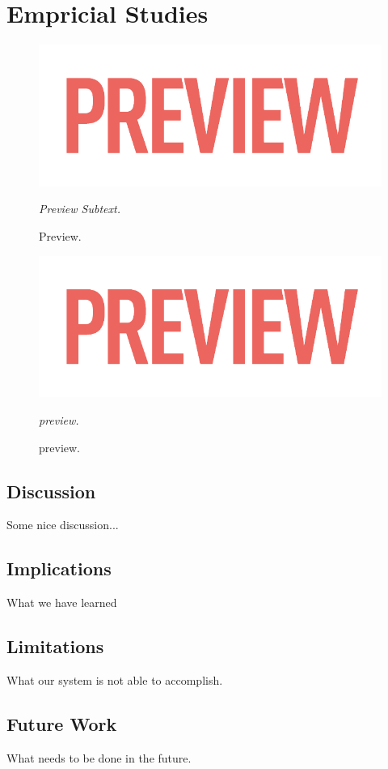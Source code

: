 
\cleartoleftpage

\chapter{Empricial Studies}
\label{chap4}

\lipsum[1]

\begin{figure}[H]
	\captionsetup{width=\textwidth}
	\centering
	\includegraphics[width=\textwidth]{figures/preview.png} 
	\caption{Preview.}
	\medskip\small
	\textit{Preview Subtext.}
	\label{prev1}
\end{figure}
\lipsum[7]
\begin{figure}[b]
	\captionsetup{width=\textwidth}
	\centering
	\includegraphics[width=\textwidth]{figures/preview.png} 
	\caption{preview.}
	\medskip\small
	\textit{preview. }
	\label{prev2}
\end{figure}

\section{Discussion}
Some nice discussion...

\section{Implications}
What we have learned

\section{Limitations}
What our system is not able to accomplish.

\section{Future Work}
What needs to be done in the future.

